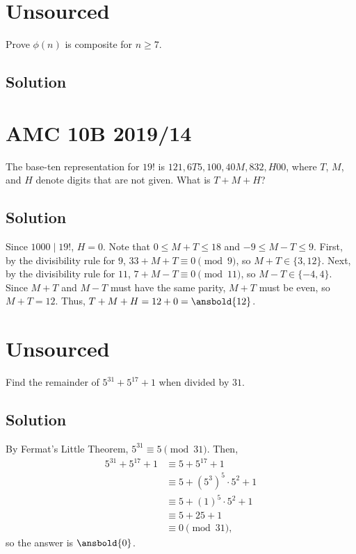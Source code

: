 \documentclass[mast]{lucky}
\begin{document}
\pagebreak\section{Unsourced}

Prove $\phi(n)$ is composite for $n\geq 7.$

\subsection{Solution}

\pagebreak\section{AMC 10B 2019/14}

The base-ten representation for $19!$ is $121,6T5,100,40M,832,H00$, where $T$, $M$, and $H$ denote digits that are not given. What is $T+M+H$?

\subsection{Solution}

Since $1000 \mid 19!$, $H = 0$. Note that $0 \leq M + T \leq 18$ and $-9 \leq M - T \leq 9$. First, by the divisibility rule for $9$, $33 + M + T  \equiv 0 \pmod 9$, so $M + T \in \{3, 12\}$. Next, by the divisibility rule for $11$, $7 + M - T \equiv 0 \pmod{11}$, so $M - T \in \{-4, 4\}$. Since $M + T$ and $M - T$ must have the same parity, $M + T$ must be even, so $M + T = 12$. Thus, $T + M + H = 12 + 0 = \ansbold{12}$.

\pagebreak\section{Unsourced}

Find the remainder of $5^{31}+5^{17}+1$ when divided by $31.$

\subsection{Solution}

By Fermat's Little Theorem, $5^{31} \equiv 5 \pmod{31}$. Then,
\begin{align*}
5^{31} + 5^{17} + 1 &\equiv 5 + 5^{17} + 1 \\
&\equiv 5 + (5^3)^5 \cdot 5^2 + 1 \\
&\equiv 5 + (1)^5 \cdot 5^2 + 1 \\
&\equiv 5 + 25 + 1 \\
&\equiv 0 \pmod{31},
\end{align*}
so the answer is $\ansbold{0}$.
\end{document}
